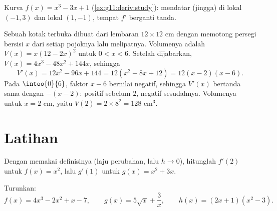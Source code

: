 \begin{omfigure}

{\small Kurva $f(x) = x^3 - 3x + 1$
(\cref{ex:g11:deriv:study}):  mendatar (jingga) di
 lokal $(-1, 3)$ dan  lokal $(1, -1)$, tempat $f'$ berganti
tanda.}
\end{omfigure}

\begin{example}[Pengoptimuman]\label{ex:g11:deriv:box}
Sebuah kotak terbuka dibuat dari lembaran $12 \times 12$ cm dengan memotong
persegi bersisi $x$ dari setiap pojoknya lalu melipatnya. Volumenya adalah
$V(x) = x(12 - 2x)^2$ untuk $0 < x < 6$. Setelah dijabarkan,
$V(x) = 4x^3 - 48x^2 + 144x$, sehingga
\[
V'(x) = 12x^2 - 96x + 144 = 12(x^2 - 8x + 12) = 12(x - 2)(x - 6).
\]
Pada $\intoo{0}{6}$, faktor $x - 6$ bernilai negatif, sehingga $V'(x)$ bertanda
sama dengan $-(x-2)$: positif sebelum $2$, negatif sesudahnya. Volumenya 
untuk $x = 2$ cm, yaitu $V(2) = 2 \times 8^2 = 128$ cm$^3$.
\end{example}

\section{Latihan}

\begin{exercise}[$\star$]\label{exo:g11:deriv:1}
Dengan memakai definisinya (laju perubahan, lalu $h \to 0$), hitunglah $f'(2)$
untuk $f(x) = x^2$, lalu $g'(1)$ untuk $g(x) = x^2 + 3x$.
\end{exercise}

\begin{exercise}[$\star$]\label{exo:g11:deriv:2}
Turunkan:
\[
f(x) = 4x^3 - 2x^2 + x - 7, \qquad
g(x) = 5\sqrt{x} + \frac{3}{x}, \qquad
h(x) = (2x+1)(x^2 - 3) .
\]
\end{exercise}

